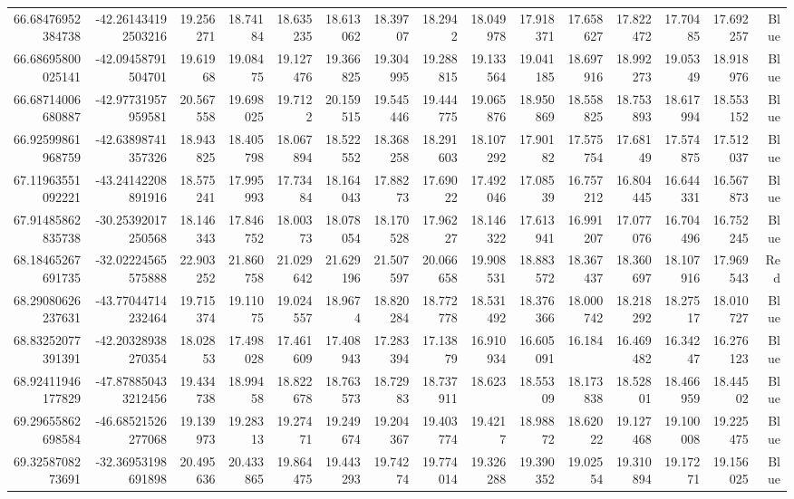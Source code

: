 \begin{center}
\begin{longtable}{rrrrrrrrrrrrrrr}
66.68476952384738 & -42.261434192503216 & 19.256271 & 18.74184 & 18.635235 & 18.613062 & 18.39707 & 18.2942 & 18.049978 & 17.918371 & 17.658627 & 17.822472 & 17.70485 & 17.692257 & Blue \\
66.68695800025141 & -42.09458791504701 & 19.61968 & 19.08475 & 19.127476 & 19.366825 & 19.304995 & 19.288815 & 19.133564 & 19.041185 & 18.697916 & 18.992273 & 19.05349 & 18.918976 & Blue \\
66.68714006680887 & -42.97731957959581 & 20.567558 & 19.698025 & 19.7122 & 20.159515 & 19.545446 & 19.444775 & 19.065876 & 18.950869 & 18.558825 & 18.753893 & 18.617994 & 18.553152 & Blue \\
66.92599861968759 & -42.63898741357326 & 18.943825 & 18.405798 & 18.067894 & 18.522552 & 18.368258 & 18.291603 & 18.107292 & 17.90182 & 17.575754 & 17.68149 & 17.574875 & 17.512037 & Blue \\
67.11963551092221 & -43.24142208891916 & 18.575241 & 17.995993 & 17.73484 & 18.164043 & 17.88273 & 17.69022 & 17.492046 & 17.08539 & 16.757212 & 16.804445 & 16.644331 & 16.567873 & Blue \\
67.91485862835738 & -30.25392017250568 & 18.146343 & 17.846752 & 18.00373 & 18.078054 & 18.170528 & 17.96227 & 18.146322 & 17.613941 & 16.991207 & 17.077076 & 16.704496 & 16.752245 & Blue \\
68.18465267691735 & -32.02224565575888 & 22.903252 & 21.860758 & 21.029642 & 21.629196 & 21.507597 & 20.066658 & 19.908531 & 18.883572 & 18.367437 & 18.360697 & 18.107916 & 17.969543 & Red \\
68.29080626237631 & -43.77044714232464 & 19.715374 & 19.11075 & 19.024557 & 18.9674 & 18.820284 & 18.772778 & 18.531492 & 18.376366 & 18.000742 & 18.218292 & 18.27517 & 18.010727 & Blue \\
68.83252077391391 & -42.20328938270354 & 18.02853 & 17.498028 & 17.461609 & 17.408943 & 17.283394 & 17.13879 & 16.910934 & 16.605091 & 16.184 & 16.469482 & 16.34247 & 16.276123 & Blue \\
68.92411946177829 & -47.878850433212456 & 19.434738 & 18.99458 & 18.822678 & 18.763573 & 18.72983 & 18.737911 & 18.623 & 18.55309 & 18.173838 & 18.52801 & 18.466959 & 18.44502 & Blue \\
69.29655862698584 & -46.68521526277068 & 19.139973 & 19.28313 & 19.27471 & 19.249674 & 19.204367 & 19.403774 & 19.4217 & 18.98872 & 18.62022 & 19.127468 & 19.100008 & 19.225475 & Blue \\
69.3258708273691 & -32.36953198691898 & 20.495636 & 20.433865 & 19.864475 & 19.443293 & 19.74274 & 19.774014 & 19.326288 & 19.390352 & 19.02554 & 19.310894 & 19.17271 & 19.156025 & Blue \\

\end{longtable}
\end{center}
